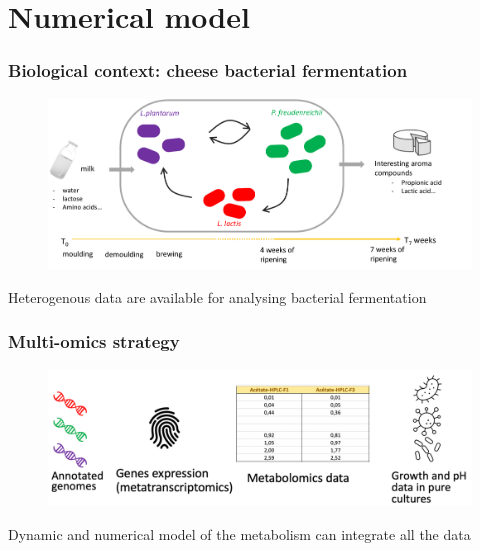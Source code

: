 \documentclass[8pt]{beamer}
\begin{document}
\section{Numerical model}
\begin{frame}
\frametitle{Biological context: cheese bacterial fermentation}
\begin{adjustwidth}{-0.8cm}{}
\begin{figure}
\includegraphics[width=1.15\textwidth]{figures/context-cheese}
\end{figure}
\end{adjustwidth}
\begin{block}{}
Heterogenous data are available for analysing bacterial fermentation
\end{block}
\end{frame}

\begin{frame}
\frametitle{Multi-omics strategy}
\begin{adjustwidth}{-0.8cm}{}
\begin{figure}
\includegraphics[width=1.15\textwidth]{figures/multi-omics}
\end{figure}
\end{adjustwidth}
\begin{block}{}
Dynamic and numerical model of the metabolism can integrate all the data
\end{block}
\end{frame}
\end{document}
